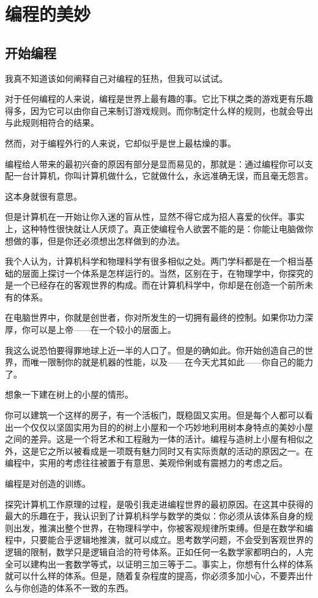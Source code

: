 \chapter{编程的美妙}
\section{开始编程}

我真不知道该如何阐释自己对编程的狂热，但我可以试试。

对于任何编程的人来说，编程是世界上最有趣的事。它比下棋之类的游戏更有乐趣得多，因为它可以由你自己来制订游戏规则。而你制定什么样的规则，也就会导出与此规则相符合的结果。

然而，对于编程外行的人来说，它却似乎是世上最枯燥的事。

编程给人带来的最初兴奋的原因有部分是显而易见的，那就是：通过编程你可以支配一台计算机，你叫计算机做什么，它就做什么，永远准确无误，而且毫无怨言。

这本身就很有意思。

但是计算机在一开始让你入迷的盲从性，显然不得它成为招人喜爱的伙伴。事实上，这种特性很快就让人厌烦了。真正使编程令人欲罢不能的是：你能让电脑做你想做的事，但是你还必须想出怎样做到的办法。

我个人认为，计算机科学和物理科学有很多相似之处。两门学科都是在一个相当基础的层面上探讨一个体系是怎样运行的。当然，区别在于，在物理学中，你探究的是一个已经存在的客观世界的构成。而在计算机科学中，你却是在创造一个前所未有的体系。

在电脑世界中，你就是创世者，你对所发生的一切拥有最终的控制。如果你功力深厚，你可以是上帝——在一个较小的层面上。

我这么说恐怕要得罪地球上近一半的人口了。但是的确如此。你开始创造自己的世界，而唯一限制你的就是机器的性能，以及——在今天尤其如此——你自己的能力了。

 

想象一下建在树上的小屋的情形。

你可以建筑一个这样的房子，有一个活板门，既稳固又实用。但是每个人都可以看出一个仅仅以坚固实用为目的的树上小屋和一个巧妙地利用树本身特点的美妙小屋之间的差异。这是一个将艺术和工程融为一体的活计。编程与造树上小屋有相似之外，这是它之所以被看成是一项既有魅力同时又有实际贡献的活动的原因之一。在编程中，实用的考虑往往被置于有意思、美观伶俐或有震撼力的考虑之后。

编程是对创造的训练。

探究计算机工作原理的过程，是吸引我走进编程世界的最初原因。在这其中获得的最大的乐趣在于，我认识到了计算机科学与数学的类似：你必须从该体系自身的规则出发，推演出整个世界，在物理科学中，你被客观规律所束缚。但是在数学和编程中，只要能合乎逻辑地推演，就可以成立。思考数学问题，不会受到客观世界的逻辑的限制，数学只是逻辑自洽的符号体系。正如任何一名数学家都明白的，人完全可以建构出一套数学等式，以证明三加三等于二。事实上，你想有什么样的体系就可以什么样的体系。但是，随着复杂程度的提高，你必须多加小心，不要弄出什么与你创造的体系不一致的东西。

